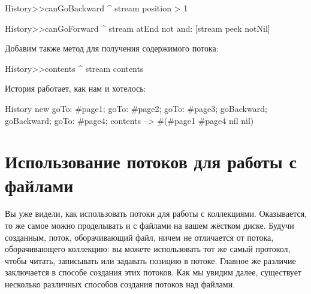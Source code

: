 \documentclass[a4paper,10pt,twoside]{book}
\begin{document}
\begin{code}{}
History>>canGoBackward
  ^ stream position > 1

History>>canGoForward
  ^ stream atEnd not and: [stream peek notNil]
\end{code}

Добавим также метод для получения содержимого потока:
\begin{code}{}
History>>contents
  ^ stream contents
\end{code}

История работает, как нам и хотелось:
\begin{code}{}
History new
	goTo: #page1;
	goTo: #page2;
	goTo: #page3;
	goBackward;
	goBackward;
	goTo: #page4;
	contents --> #(#page1 #page4 nil nil)
\end{code}

\section{Использование потоков для работы с файлами}

Вы уже видели, как использовать потоки для работы с коллекциями. Оказывается, то же самое можно проделывать и с файлами на вашем жёстком диске.
Будучи созданным, поток, оборачивающий файл, ничем не отличается от потока, оборачивающего коллекцию: вы можете использовать тот же самый протокол, чтобы читать, записывать или задавать позицию в потоке.
Главное же различие заключается в способе создания этих потоков.
Как мы увидим далее, существует несколько различных способов создания потоков над файлами.

\end{document}

